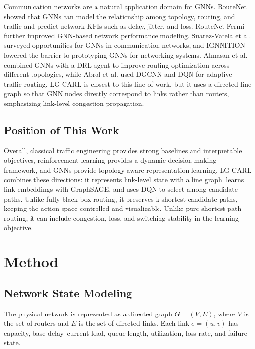 \documentclass[9pt,a4paper,twocolumn,twoside]{rho-class/rho}
\begin{document}
Communication networks are a natural application domain for GNNs. RouteNet \cite{rusek2020routenet} showed that GNNs can model the relationship among topology, routing, and traffic and predict network KPIs such as delay, jitter, and loss. RouteNet-Fermi \cite{suarezvarela2022routenetfermi} further improved GNN-based network performance modeling. Suarez-Varela et al. \cite{suarezvarela2022graph} surveyed opportunities for GNNs in communication networks, and IGNNITION \cite{pujolperich2021ignnition} lowered the barrier to prototyping GNNs for networking systems. Almasan et al. \cite{almasan2019deep} combined GNNs with a DRL agent to improve routing optimization across different topologies, while Abrol et al. \cite{abrol2024deep} used DGCNN and DQN for adaptive traffic routing. LG-CARL is closest to this line of work, but it uses a directed line graph so that GNN nodes directly correspond to links rather than routers, emphasizing link-level congestion propagation.

\subsection{Position of This Work}

Overall, classical traffic engineering provides strong baselines and interpretable objectives, reinforcement learning provides a dynamic decision-making framework, and GNNs provide topology-aware representation learning. LG-CARL combines these directions: it represents link-level state with a line graph, learns link embeddings with GraphSAGE, and uses DQN to select among candidate paths. Unlike fully black-box routing, it preserves k-shortest candidate paths, keeping the action space controlled and visualizable. Unlike pure shortest-path routing, it can include congestion, loss, and switching stability in the learning objective.

\section{Method}

\subsection{Network State Modeling}

The physical network is represented as a directed graph $G=(V,E)$, where $V$ is the set of routers and $E$ is the set of directed links. Each link $e=(u,v)$ has capacity, base delay, current load, queue length, utilization, loss rate, and failure state.
\end{document}
